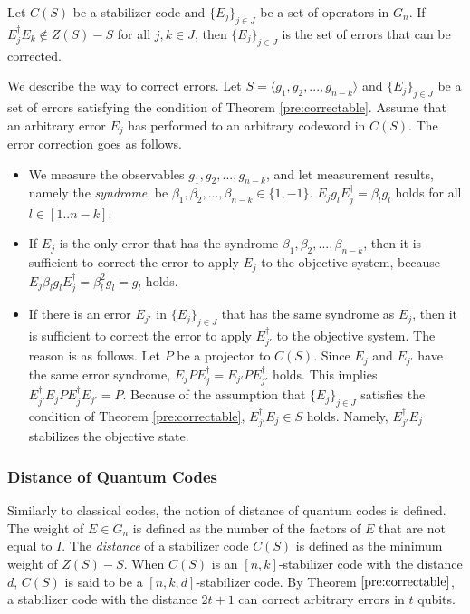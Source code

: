 \begin{thm}
\label{pre:correctable}
 Let $C(S)$ be a stabilizer code and $\{E_j\}_{j \in J}$ be a set of
 operators in $G_n$. If $E_j^\dagger E_k \notin Z(S) - S$ for all 
$j, k \in J$, then $\{E_j\}_{j \in J}$ is the set of errors
that can be corrected.
\end{thm}
We describe the way to correct errors. 
Let $S = \langle g_1, g_2,..., g_{n-k} \rangle$ and $\{E_j\}_{j \in J}$
be a set of errors satisfying the condition of Theorem
\ref{pre:correctable}. Assume that an arbitrary error $E_j$ has
performed to an arbitrary codeword in $C(S)$. The error correction
goes as follows.
\begin{itemize}
 \item We measure the observables $g_1,g_2,...,g_{n-k}$, and
       let measurement results, namely the \emph{syndrome},
       be $\beta_1,\beta_2,...,\beta_{n-k} \in
       \{1,-1\}$. $E_j g_l E_j^\dagger = \beta_l g_l$ holds for all $l
       \in [1..n-k]$.
 \item If $E_j$ is the only error that has the syndrome
       $\beta_1,\beta_2,...,\beta_{n-k}$, then it is sufficient
       to correct the error to apply $E_j$ to the objective system,
       because $E_j\beta_l g_l E_j^\dagger = \beta_l^2 g_l = g_l$ holds.
 \item If there is an error $E_{j'}$ in $\{E_j\}_{j \in J}$
       that has the same syndrome as $E_j$, then it is sufficient
       to correct the error to apply $E_{j'}^\dagger$ to the objective
       system.
       The reason is as follows. Let $P$ be a projector to $C(S)$.
       Since $E_j$ and $E_{j'}$ have the same error syndrome,
       $E_jPE_j^\dagger = E_{j'}PE_{j'}^\dagger$ holds.
       This implies $E_{j'}^\dagger E_jPE_j^\dagger E_{j'} = P$.
       Because of the assumption that $\{E_j\}_{j \in J}$ satisfies
       the condition of Theorem \ref{pre:correctable},
       $E_{j'}^\dagger E_{j} \in S$ holds. Namely, $E_{j'}^\dagger E_j$
       stabilizes the objective state.
\end{itemize}
\subsubsection{Distance of Quantum Codes}
Similarly to classical codes, the notion of distance of
quantum codes is defined. The weight of $E \in G_n$ is defined
as the number of the factors of $E$ that are not equal to $I$.
The \emph{distance} of a stabilizer code $C(S)$
is defined as the minimum weight of $Z(S) - S$.
When $C(S)$ is an $[n,k]$-stabilizer code with the distance $d$,
$C(S)$ is said to be a $[n,k,d]$-stabilizer code.
By Theorem $\ref{pre:correctable}$, a stabilizer code with the distance
$2t+1$ can correct arbitrary errors in $t$ qubits.

